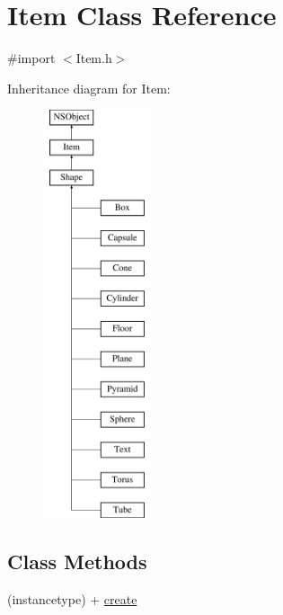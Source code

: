 \hypertarget{interface_item}{}\section{Item Class Reference}
\label{interface_item}


{\ttfamily \#import $<$Item.\+h$>$}

Inheritance diagram for Item\+:\begin{figure}[H]
\begin{center}
\leavevmode
\includegraphics[height=12.000000cm]{interface_item}
\end{center}
\end{figure}
\subsection*{Class Methods}
\begin{DoxyCompactItemize}
\item 
(instancetype) + \hyperlink{interface_item_a4bef9d8be8269c8ed070d714c5286fa1}{create}
\end{DoxyCompactItemize}
